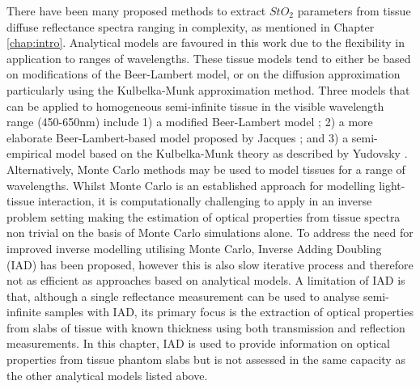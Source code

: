 There have been many proposed methods to extract $StO_2$ parameters from tissue diffuse reflectance spectra ranging in complexity, as mentioned in Chapter \ref{chap:intro}. 
Analytical models are favoured in this work due to the flexibility in application to ranges of wavelengths. These tissue models tend to either be based on modifications of the Beer-Lambert model, or on the diffusion approximation particularly using the Kulbelka-Munk approximation method\cite{MacKenzie2018}. Three models that can be applied to homogeneous semi-infinite tissue in the visible wavelength range (450-650nm) include 1) a modified Beer-Lambert model \cite{Clancy2015}; 2) a more elaborate Beer-Lambert-based model proposed by Jacques \cite{Jacques1999}; and 3) a semi-empirical model based on the Kulbelka-Munk theory as described by Yudovsky \cite{Yudovsky2009}.
Alternatively, Monte Carlo methods may be used to model tissues for a range of wavelengths. Whilst Monte Carlo is an established approach for modelling light-tissue interaction, it is computationally challenging to apply in an inverse problem setting making the estimation of optical properties from tissue spectra non trivial on the basis of Monte Carlo simulations alone.
To address the need for improved inverse modelling utilising Monte Carlo, Inverse Adding Doubling (IAD)\cite{Prahl2017} has been proposed, however this is also slow iterative process and therefore not as efficient as approaches based on analytical models.
A limitation of IAD is that, although a single reflectance measurement can be used to analyse semi-infinite samples with IAD, its primary focus is the extraction of optical properties from slabs of tissue with known thickness using both transmission and reflection measurements.
In this chapter, IAD is used to provide information on optical properties from tissue phantom slabs but is not assessed in the same capacity as the other 
analytical models listed above. 

